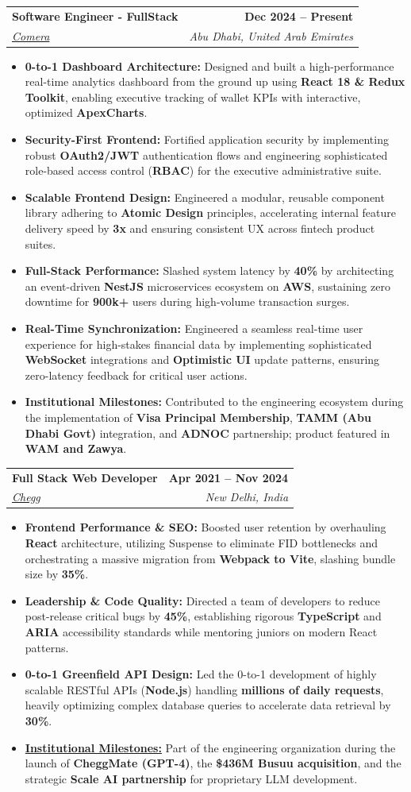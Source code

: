 \documentclass[letterpaper,12pt]{article}
\makeatletter
\newcommand{\resumeItem}[1]{
  \item\small{
    {#1}
  }
}
\newcommand{\resumeSubheading}[4]{
  \vspace{4pt}\item
    \begin{tabular*}{1.0\textwidth}[t]{l@{\extracolsep{\fill}}r}
      \textbf{#1} & \textbf{\small #2} \\
      \textit{\small#3} & \textit{\small #4} \\
    \end{tabular*}\vspace{2pt}
}
\newcommand{\resumeItemListStart}{\begin{itemize}}
\newcommand{\resumeItemListEnd}{\end{itemize}\vspace{-2pt}}
\makeatother
\begin{document}
    \resumeSubheading
      {Software Engineer - FullStack}{Dec 2024 -- Present}
      {\href{https://mycomera.com/}{Comera}}{Abu Dhabi, United Arab Emirates}
      \resumeItemListStart
        \resumeItem{\textbf{0-to-1 Dashboard Architecture:} Designed and built a high-performance real-time analytics dashboard from the ground up using \textbf{React 18 \& Redux Toolkit}, enabling executive tracking of wallet KPIs with interactive, optimized \textbf{ApexCharts}.}
        \resumeItem{\textbf{Security-First Frontend:} Fortified application security by implementing robust \textbf{OAuth2/JWT} authentication flows and engineering sophisticated role-based access control (\textbf{RBAC}) for the executive administrative suite.}
        \resumeItem{\textbf{Scalable Frontend Design:} Engineered a modular, reusable component library adhering to \textbf{Atomic Design} principles, accelerating internal feature delivery speed by \textbf{3x} and ensuring consistent UX across fintech product suites.}
        \resumeItem{\textbf{Full-Stack Performance:} Slashed system latency by \textbf{40\%} by architecting an event-driven \textbf{NestJS} microservices ecosystem on \textbf{AWS}, sustaining zero downtime for \textbf{900k+} users during high-volume transaction surges.}
        \resumeItem{\textbf{Real-Time Synchronization:} Engineered a seamless real-time user experience for high-stakes financial data by implementing sophisticated \textbf{WebSocket} integrations and \textbf{Optimistic UI} update patterns, ensuring zero-latency feedback for critical user actions.}
        \resumeItem{\textbf{Institutional Milestones:} Contributed to the engineering ecosystem during the implementation of \textbf{Visa Principal Membership}, \textbf{TAMM (Abu Dhabi Govt)} integration, and \textbf{ADNOC} partnership; product featured in \textbf{WAM and Zawya}.}
      \resumeItemListEnd

    \resumeSubheading
      {Full Stack Web Developer}{Apr 2021 -- Nov 2024}
      {\href{https://www.chegg.com/}{Chegg}}{New Delhi, India}
      \resumeItemListStart
        \resumeItem{\textbf{Frontend Performance \& SEO:} Boosted user retention by overhauling \textbf{React} architecture, utilizing Suspense to eliminate FID bottlenecks and orchestrating a massive migration from \textbf{Webpack to Vite}, slashing bundle size by \textbf{35\%}.}
        \resumeItem{\textbf{Leadership \& Code Quality:} Directed a team of developers to reduce post-release critical bugs by \textbf{45\%}, establishing rigorous \textbf{TypeScript} and \textbf{ARIA} accessibility standards while mentoring juniors on modern React patterns.}
        \resumeItem{\textbf{0-to-1 Greenfield API Design:} Led the 0-to-1 development of highly scalable RESTful APIs (\textbf{Node.js}) handling \textbf{millions of daily requests}, heavily optimizing complex database queries to accelerate data retrieval by \textbf{30\%}.}
        \resumeItem{\textbf{\href{https://jaseem8.github.io/\#chegg}{Institutional Milestones:}} Part of the engineering organization during the launch of \textbf{CheggMate (GPT-4)}, the \textbf{\$436M Busuu acquisition}, and the strategic \textbf{Scale AI partnership} for proprietary LLM development.}
      \resumeItemListEnd
\end{document}
